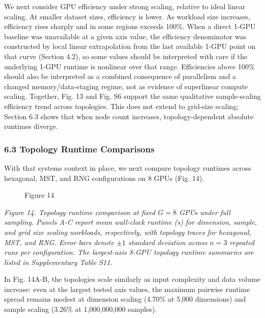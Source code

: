 \documentclass[
]{article}
\makeatletter
\newcommand*\pandocbounded[1]{%
  \sbox\pandoc@box{#1}%
  \Gscale@div\@tempa{\textheight}{\dimexpr\ht\pandoc@box+\dp\pandoc@box\relax}%
  \Gscale@div\@tempb{\linewidth}{\wd\pandoc@box}%
  \ifdim\@tempb\p@<\@tempa\p@\let\@tempa\@tempb\fi%
  \ifdim\@tempa\p@<\p@\scalebox{\@tempa}{\usebox\pandoc@box}%
  \else\usebox{\pandoc@box}%
  \fi%
}
\providecommand{\DIFadd}[1]{{\protect\color{blue} #1}} %
\providecommand{\DIFaddbegin}{} %
\providecommand{\DIFaddend}{} %
\providecommand{\DIFaddFL}[1]{\DIFadd{#1}} %
\providecommand{\DIFaddbeginFL}{} %
\providecommand{\DIFaddendFL}{} %
\makeatother
\begin{document}
We next consider GPU efficiency under strong scaling, relative to ideal
linear scaling. At smaller dataset sizes, efficiency is lower. As
workload size increases, efficiency rises sharply and in some regions
exceeds 100\%. When a direct 1-GPU baseline was unavailable at a given
axis value, the efficiency denominator was constructed by local linear
extrapolation from the last available 1-GPU point on that curve (Section
4.2), so some values should be interpreted with care if the underlying
1-GPU runtime is nonlinear over that range. \DIFaddbegin \DIFadd{Efficiencies above 100\%
should also be interpreted as a combined consequence of parallelism and
a changed memory/data-staging regime, not as evidence of superlinear
compute scaling. Together, Fig. 13 and }\DIFaddend Fig.  \DIFaddbegin \DIFadd{S6 support the same
qualitative sample-scaling efficiency trend across topologies. This does
not extend to grid-size scaling; Section 6.3 shows that when node count
increases, topology-dependent absolute runtimes diverge.
}\DIFaddend

\subsubsection{6.3 Topology Runtime
Comparisons}\label{topology-runtime-comparisons}

With that systems context in place, we next compare topology runtimes
across hexagonal, MST, and RNG configurations on 8 GPUs (Fig.  \DIFaddbegin \DIFadd{14}\DIFaddend ).

\begin{figure}
\centering
 \DIFaddbeginFL \pandocbounded{}
\DIFaddendFL \caption{Figure  \DIFaddbeginFL \DIFaddFL{14}\DIFaddendFL }
\end{figure}

\emph{Figure  \DIFaddbegin \DIFadd{14. }\DIFaddend Topology runtime comparison at fixed \(G=8\) GPUs under
full sampling. Panels A-C report mean wall-clock runtime (s) for
dimension, sample, and grid size scaling workloads, respectively, with
topology traces for hexagonal, MST, and RNG. Error bars denote \(\pm 1\)
standard deviation across \(n=3\) repeated runs per configuration. The
largest-axis 8-GPU topology runtime summaries are listed in
Supplementary Table S11.}

In Fig.  \DIFaddbegin \DIFadd{14A-B}\DIFaddend , the topologies scale similarly as input complexity and
data volume increase: even at the largest tested axis values, the
maximum pairwise runtime spread remains modest at dimension scaling
(4.70\% at 5,000 dimensions) and sample scaling (3.26\% at 1,000,000,000
samples).
\end{document}

